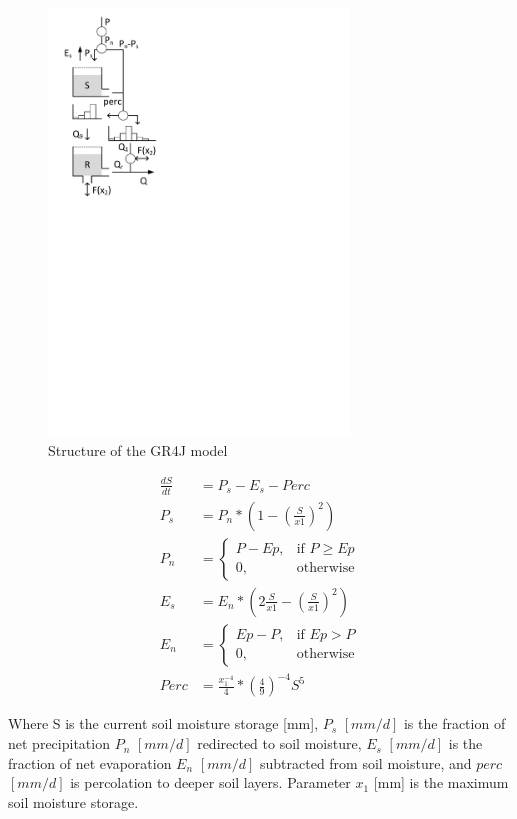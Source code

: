 { 																	%
\begin{figure}
\includegraphics[trim=1cm 17cm 7cm 1cm,width=8cm,keepaspectratio]{./files/07_schematic.pdf}
\caption{Structure of the GR4J model} \label{fig:07_schematic}
\end{figure}

\begin{align}
	\frac{dS}{dt} &= P_s-E_s-Perc \\
	P_s &= P_n* \left(1-\left(\frac{S}{x1}\right)^2\right)\\
	P_n &= 
	\begin{cases}
		P-Ep, & \text{if } P \geq Ep \\
		0, & \text{otherwise}
	\end{cases} \\
	E_s &= E_n*\left(2\frac{S}{x1}-\left(\frac{S}{x1}\right)^2\right)\\
	E_n &= 
	\begin{cases}
		Ep-P, & \text{if } Ep > P \\
		0, & \text{otherwise}
	\end{cases} \\
	Perc &= \frac{x_1^{-4}}{4}*\left(\frac{4}{9}\right)^{-4}S^5
\end{align}

Where S is the current soil moisture storage [mm], $P_s$ $[mm/d]$ is the fraction of net precipitation $P_n$ $[mm/d]$ redirected to soil moisture, $E_s$ $[mm/d]$ is the fraction of net evaporation $E_n$ $[mm/d]$ subtracted from soil moisture, and $perc$ $[mm/d]$ is percolation to deeper soil layers. Parameter $x_1$ [mm] is the maximum soil moisture storage.

} %

